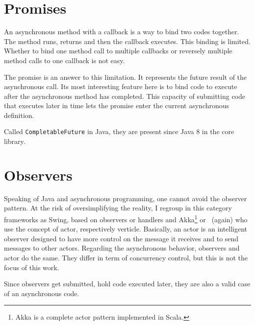 
\section{Promises}

An asynchronous method with a callback is a way to bind two codes together. The method runs, returns and then the callback executes. This binding is limited. Whether to bind one method call to multiple callbacks or reversely multiple method calls to one callback is not easy. 

The promise is an answer to this limitation. It represents the future result of the asynchronous call. Its most interesting feature here is to bind code to execute after the asynchronous method has completed. This capacity of submitting code that executes later in time lets the promise enter the current asynchronous definition.

Called \lstinline{CompletableFuture} in Java, they are present since Java 8 in the core library.


\section{Observers}

Speaking of Java and asynchronous programming, one cannot avoid the observer pattern. At the risk of oversimplifying the reality, I regroup in this category frameworks as Swing, based on observers or handlers and Akka\footnote{Akka is a complete actor pattern implemented in Scala.} or \vertx\ (again) who use the concept of actor, respectively verticle. Basically, an actor is an intelligent observer designed to have more control on the message it receives and to send messages to other actors. Regarding the asynchronous behavior, observers and actor do the same. They differ in term of concurrency control, but this is not the focus of this work.

Since observers get submitted, hold code executed later, they are also a valid case of an asynchronous code.

